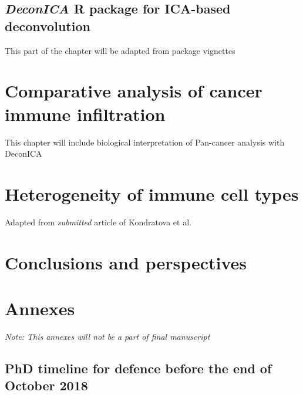 \documentclass[12pt,]{book}
\theoremstyle{definition}
\theoremstyle{definition}
\theoremstyle{definition}
\theoremstyle{remark}
\begin{document}
\hypertarget{deconica-r-package-for-ica-based-deconvolution}{%
\section{\texorpdfstring{\emph{DeconICA} R package for ICA-based
deconvolution}{DeconICA R package for ICA-based deconvolution}}\label{deconica-r-package-for-ica-based-deconvolution}}

This part of the chapter will be adapted from package vignettes



\hypertarget{results}{%
\chapter{Comparative analysis of cancer immune
infiltration}\label{results}}

This chapter will include biological interpretation of Pan-cancer
analysis with DeconICA

\hypertarget{section}{%
\section{}\label{section}}

\hypertarget{map}{%
\chapter{Heterogeneity of immune cell types}\label{map}}

Adapted from \emph{submitted} article of Kondratova et al.



\hypertarget{conclusions}{%
\chapter{Conclusions and perspectives}\label{conclusions}}

\hypertarget{annexes}{%
\chapter*{Annexes}\label{annexes}}

\emph{Note: This annexes will not be a part of final manuscript}

\hypertarget{phd-timeline-for-defence-before-the-end-of-october-2018}{%
\section*{PhD timeline for defence before the end of October
2018}\label{phd-timeline-for-defence-before-the-end-of-october-2018}}
\end{document}
